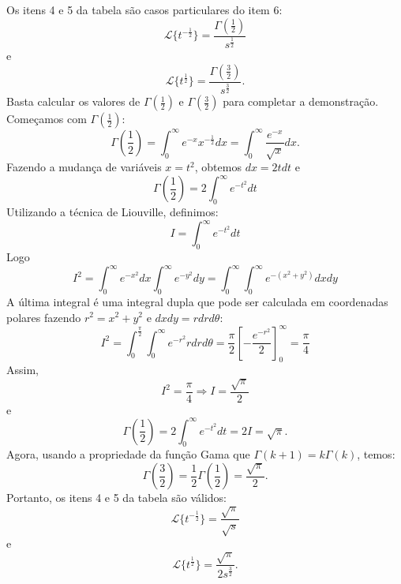 \begin{ex} Os itens 4 e 5 da tabela são casos particulares do item 6:
 $$
 \mathcal{L}\{t^{-\frac{1}{2}}\}=\frac{\Gamma\left(\frac{1}{2}\right)}{s^{\frac{1}{2}}}
 $$
e
 $$
 \mathcal{L}\{t^{\frac{1}{2}}\}=\frac{\Gamma\left(\frac{3}{2}\right)}{s^{\frac{3}{2}}}.
 $$
 Basta calcular os valores de $\Gamma\left(\frac{1}{2}\right)$ e $\Gamma\left(\frac{3}{2}\right)$ para completar a demonstração. Começamos com $\Gamma\left(\frac{1}{2}\right)$:
 $$
 \Gamma\left(\frac{1}{2}\right)=\int_0^\infty e^{-x}x^{-\frac{1}{2}}dx=\int_0^\infty \frac{e^{-x}}{\sqrt{x}}dx.
 $$
 Fazendo a mudança de variáveis $x=t^{2}$, obtemos $dx=2tdt$ e
$$\Gamma\left(\frac{1}{2}\right)=2\int_{0}^{\infty}e^{-t^2}dt
$$
Utilizando a técnica de Liouville, definimos:
$$
I=\int_{0}^{\infty}e^{-t^2}dt
$$
Logo
$$
I^2=\int_{0}^{\infty}e^{-x^2}dx\int_{0}^{\infty}e^{-y^2}dy=\int_{0}^{\infty}\int_{0}^{\infty}e^{-(x^2+y^2)}dx dy
$$
A última integral é uma integral dupla que pode ser calculada em coordenadas polares fazendo $r^2=x^2+y^2$ e $dxdy=rdrd\theta$:
$$
I^2=\int_{0}^{\frac{\pi}{2}}\int_{0}^{\infty}e^{-r^2}rdr d{\theta}=\frac{\pi}{2}\left[-\frac{e^{-r^2}}{2}\right]_0^\infty=\frac{\pi}{4}
$$
Assim,
$$
I^2=\frac{\pi}{4}\Rightarrow I=\frac{\sqrt{\pi}}{2}
$$
e
$$
\Gamma\left(\frac{1}{2}\right)=2\int_{0}^{\infty}e^{-t^2}dt=2I=\sqrt{\pi}.
$$
Agora, usando a propriedade da função Gama que $\Gamma(k+1)=k\Gamma(k)$, temos:
$$
\Gamma\left(\frac{3}{2}\right)=\frac{1}{2}\Gamma\left(\frac{1}{2}\right)=\frac{\sqrt{\pi}}{2}.
$$
Portanto, os itens 4 e 5 da tabela são válidos:
$$
 \mathcal{L}\{t^{-\frac{1}{2}}\}=\frac{\sqrt{\pi}}{\sqrt{s}}
$$
e
$$
 \mathcal{L}\{t^{\frac{1}{2}}\}=\frac{\sqrt{\pi}}{2s^{\frac{3}{2}}}.
$$
 \end{ex}

